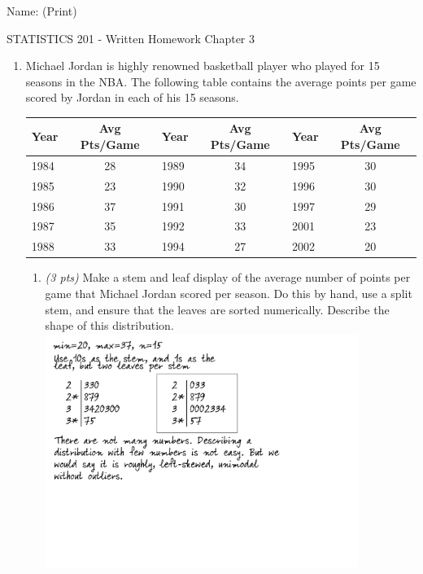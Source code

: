 \documentclass{article}[11pt]
\begin{document}
\hspace{2in} Name: (Print) \underline{\mbox{\hspace{3.5in}}}\\

\begin{center}
{\Large STATISTICS 201 - Written Homework Chapter 3}\\[3mm]
\end{center}

\begin{enumerate}

\item Michael Jordan is highly renowned basketball player who played for 15 seasons in the NBA.  The following table contains the average points per game scored by Jordan in each of his 15 seasons.

\begin{center}
\begin{tabular}{|l|c||l|c||l|c|} \hline
Year & Avg Pts/Game & Year & Avg Pts/Game & Year & Avg Pts/Game 
\\ \hline
1984 & 28 & 1989 & 34 & 1995 & 30 \\
1985 & 23 & 1990 & 32 & 1996 & 30 \\
1986 & 37 & 1991 & 30 & 1997 & 29 \\
1987 & 35 & 1992 & 33 & 2001 & 23 \\
1988 & 33 & 1994 & 27 & 2002 & 20 \\ \hline
\end{tabular}
\end{center}

\begin{enumerate}
\item {\em (3 pts)} Make a stem and leaf display of the average number of points per game that Michael Jordan scored per season.  Do this by hand, use a split stem, and ensure that the leaves are sorted numerically. Describe the shape of this distribution. \\

\includegraphics[width=4in]{hwk3-stuff.pdf}


\end{enumerate}
\end{enumerate}
\end{document}
